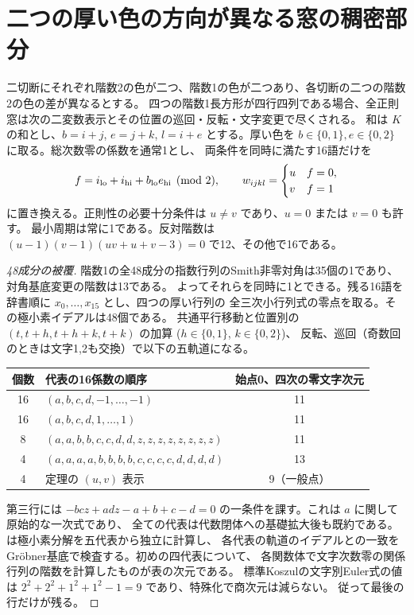 \section{二つの厚い色の方向が異なる窓の稠密部分}
\label{sec:klein-transverse-dense}
\begin{theorem}\label{thm:klein-transverse-dense}
二切断にそれぞれ階数2の色が二つ、階数1の色が二つあり、各切断の二つの階数2の色の差が異なるとする。
四つの階数1長方形が四行四列である場合、全正則窓は次の二変数表示とその位置の巡回・反転・文字変更で尽くされる。
和は $K$ の和とし、$b=i+j$, $e=j+k$, $l=i+e$ とする。厚い色を
$b\in\{0,1\}, e\in\{0,2\}$ に取る。総次数零の係数を通常1とし、
両条件を同時に満たす16語だけを
\[
 f=i_{\rm lo}+i_{\rm hi}+b_{\rm lo} e_{\rm hi}\pmod2,\qquad
 w_{ijkl}=\begin{cases}u&f=0,\\v&f=1\end{cases}
\]
に置き換える。正則性の必要十分条件は $u\ne v$ であり、$u=0$ または $v=0$ も許す。
最小周期は常に1である。反対階数は
$(u-1)(v-1)(uv+u+v-3)=0$ で12、その他で16である。
\end{theorem}

\begin{proof}[48成分の被覆]
階数1の全48成分の指数行列のSmith非零対角は35個の1であり、対角基底変更の階数は13である。
よってそれらを同時に1とできる。残る16語を辞書順に $x_0,\ldots,x_{15}$ とし、四つの厚い行列の
全三次小行列式の零点を取る。その極小素イデアルは48個である。
共通平行移動と位置別の $(t,t+h,t+h+k,t+k)$ の加算 ($h\in\{0,1\}$, $k\in\{0,2\}$)、
反転、巡回（奇数回のときは文字1,2も交換）で以下の五軌道になる。
\begin{center}
\begin{tabular}{c|l|c}
個数 & 代表の16係数の順序 & 始点0、四次の零文字次元\\\hline
16 & $(a,b,c,d,-1,\ldots,-1)$ & 11\\
16 & $(a,b,c,d,1,\ldots,1)$ & 11\\
8 & $(a,a,b,b,c,c,d,d,z,z,z,z,z,z,z,z)$ & 11\\
4 & $(a,a,a,a,b,b,b,b,c,c,c,c,d,d,d,d)$ & 13\\
4 & 定理の $(u,v)$ 表示 & 9（一般点）\end{tabular}
\end{center}
第三行には $-bcz+adz-a+b+c-d=0$ の一条件を課す。これは $a$ に関して原始的な一次式であり、
全ての代表は代数閉体への基礎拡大後も既約である。
 は極小素分解を五代表から独立に計算し、
各代表の軌道のイデアルとの一致をGröbner基底で検査する。初めの四代表について、
各関数体で文字次数零の関係行列の階数を計算したものが表の次元である。
標準Koszulの文字別Euler式の値は $2^2+2^2+1^2+1^2-1=9$ であり、特殊化で商次元は減らない。
従って最後の行だけが残る。
\end{proof}

